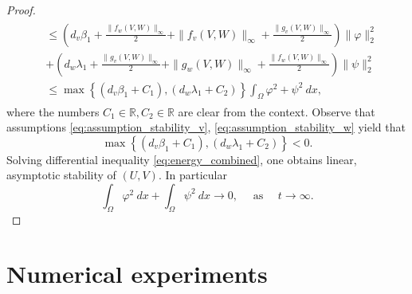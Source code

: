 \documentclass[11pt, a4paper]{article}
\theoremstyle{break}
\theoremstyle{break}
\theoremstyle{break}
\theoremstyle{break}
\theoremstyle{break}
\theoremstyle{break}
\theoremstyle{break}
\begin{document}
\begin{proof}
\begin{align}
\begin{split}
            &\leq
            \left(d_v \beta_1 + \frac{\|f_w(V,W)\|_\infty}{2} + \| f_v(V, W) \|_\infty + \frac{\|g_v(V,W)\|_\infty}{2}\right) \|\varphi\|_2^2 \\
            &+
            \left(d_w \lambda_1 + \frac{\|g_v(V,W)\|_\infty}{2} + \|g_w(V, W)\|_\infty + 
            \frac{\|f_w(V,W)\|_\infty}{2} \right)\|\psi\|_2^2 \\
            &\leq
            \max\left\{\left(d_v \beta_1 + C_1
            \right), \left(d_w \lambda_1 + C_2\right)\right\}\int_\Omega \varphi^2 + \psi^2\:dx,
        \end{split}
    \end{align}
    where the numbers $C_1 \in \mathbb{R}, C_2 \in \mathbb{R}$ are clear from the context. Observe that assumptions \eqref{eq:assumption_stability_v}, \eqref{eq:assumption_stability_w} yield that
    \begin{equation}
        \label{eq:linearized_stability_condition}
        \max\left\{\left(d_v \beta_1 + C_1
            \right), \left(d_w \lambda_1 + C_2\right)\right\} < 0.
    \end{equation}
    Solving differential inequality \eqref{eq:energy_combined}, one obtains linear, asymptotic stability of $(U, V)$. In particular
    \begin{equation}
        \int_\Omega \varphi^2\:dx + \int_\Omega \psi^2\:dx \rightarrow 0, \quad \text{ as } \quad t \rightarrow \infty.
    \end{equation}
\end{proof}

\section{Numerical experiments}
\end{document}
